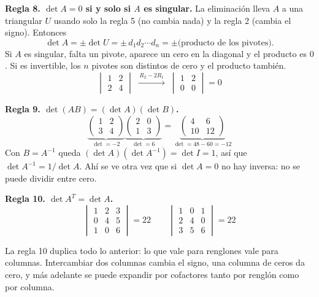 \documentclass[11pt,letterpaper]{article}
\begin{document}
\textbf{Regla 8. $\det A = 0$ si y solo si $A$ es singular.} La
eliminación lleva $A$ a una triangular $U$ usando solo la regla 5 (no
cambia nada) y la regla 2 (cambia el signo). Entonces
\[
    \det A = \pm \det U = \pm\, d_1 d_2 \cdots d_n
    = \pm \text{(producto de los pivotes)} .
\]
Si $A$ es singular, falta un pivote, aparece un cero en la diagonal y
el producto es $0$. Si es invertible, los $n$ pivotes son distintos de
cero y el producto también.
\[
    \begin{vmatrix} 1 & 2 \\ 2 & 4 \end{vmatrix}
    \;\xrightarrow{\,R_2 - 2R_1\,}\;
    \begin{vmatrix} 1 & 2 \\ 0 & 0 \end{vmatrix} = 0
\]

\textbf{Regla 9. $\det(AB) = (\det A)(\det B)$.}
\[
    \underbrace{\begin{pmatrix} 1 & 2 \\ 3 & 4 \end{pmatrix}}
              _{\det = -2}
    \underbrace{\begin{pmatrix} 2 & 0 \\ 1 & 3 \end{pmatrix}}
              _{\det = 6}
    =
    \underbrace{\begin{pmatrix} 4 & 6 \\ 10 & 12 \end{pmatrix}}
              _{\det = 48 - 60 = -12}
\]
Con $B = A^{-1}$ queda $(\det A)(\det A^{-1}) = \det I = 1$, así que
$\det A^{-1} = 1 / \det A$. Ahí se ve otra vez que si $\det A = 0$ no
hay inversa: no se puede dividir entre cero.

\textbf{Regla 10. $\det A^{T} = \det A$.}
\[
    \begin{vmatrix} 1 & 2 & 3 \\ 0 & 4 & 5 \\ 1 & 0 & 6 \end{vmatrix}
    = 22
    \qquad
    \begin{vmatrix} 1 & 0 & 1 \\ 2 & 4 & 0 \\ 3 & 5 & 6 \end{vmatrix}
    = 22
\]

\begin{idea}
    La regla 10 duplica todo lo anterior: lo que vale para renglones
    vale para columnas. Intercambiar dos columnas cambia el signo, una
    columna de ceros da cero, y más adelante se puede expandir por
    cofactores tanto por renglón como por columna.
\end{idea}
\end{document}
